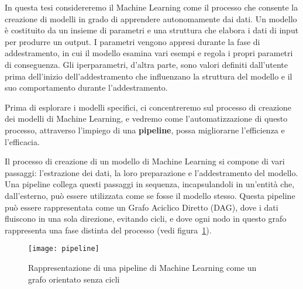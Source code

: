 \label{chap:machine_learning}

In questa tesi considereremo il Machine Learning come il processo che consente
la creazione di modelli in grado di apprendere autonomamente dai dati. Un
modello è costituito da un insieme di parametri e una struttura che elabora i
dati di input per produrre un output. I parametri vengono appresi durante la
fase di addestramento, in cui il modello esamina vari esempi e regola i propri
parametri di conseguenza. Gli iperparametri, d'altra parte, sono valori
definiti dall'utente prima dell'inizio dell'addestramento che influenzano la
struttura del modello e il suo comportamento durante l'addestramento.

Prima di esplorare i modelli specifici, ci concentreremo sul processo di
creazione dei modelli di Machine Learning, e vedremo come l'automatizzazione
di questo processo, attraverso l'impiego di una \textbf{pipeline}, possa
migliorarne l'efficienza e l'efficacia.

Il processo di creazione di un modello di Machine Learning si compone di vari
passaggi: l'estrazione dei dati, la loro preparazione e l'addestramento del
modello. Una pipeline collega questi passaggi in sequenza,
incapsulandoli in un'entità che, dall'esterno, può essere utilizzata come se
fosse il modello stesso. Questa pipeline può essere rappresentata come un
Grafo Aciclico Diretto (DAG), dove i dati fluiscono in una sola direzione,
evitando cicli, e dove ogni nodo in questo grafo rappresenta una fase distinta
del processo (vedi figura~\ref{fig:ml_pipeline_dag}).

\begin{figure}[!ht]
    \centering
    \texttt{[image: pipeline]}
    \caption{Rappresentazione di una pipeline di Machine Learning come un
    grafo orientato senza cicli}
    \label{fig:ml_pipeline_dag}
\end{figure}

